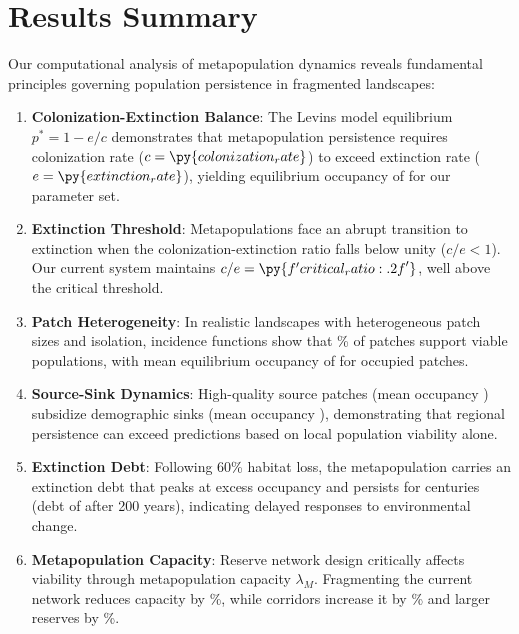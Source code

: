 \documentclass[11pt,a4paper]{article}
\begin{document}
\section{Results Summary}

Our computational analysis of metapopulation dynamics reveals fundamental principles governing population persistence in fragmented landscapes:

\begin{enumerate}
\item \textbf{Colonization-Extinction Balance}: The Levins model equilibrium $p^* = 1 - e/c$ demonstrates that metapopulation persistence requires colonization rate ($c = \py{colonization_rate}$) to exceed extinction rate ($e = \py{extinction_rate}$), yielding equilibrium occupancy of  for our parameter set.

\item \textbf{Extinction Threshold}: Metapopulations face an abrupt transition to extinction when the colonization-extinction ratio falls below unity ($c/e < 1$). Our current system maintains $c/e = \py{f'{critical_ratio:.2f}'}$, well above the critical threshold.

\item \textbf{Patch Heterogeneity}: In realistic landscapes with heterogeneous patch sizes and isolation, incidence functions show that \% of patches support viable populations, with mean equilibrium occupancy of  for occupied patches.

\item \textbf{Source-Sink Dynamics}: High-quality source patches (mean occupancy ) subsidize demographic sinks (mean occupancy ), demonstrating that regional persistence can exceed predictions based on local population viability alone.

\item \textbf{Extinction Debt}: Following 60\% habitat loss, the metapopulation carries an extinction debt that peaks at  excess occupancy and persists for centuries (debt of  after 200 years), indicating delayed responses to environmental change.

\item \textbf{Metapopulation Capacity}: Reserve network design critically affects viability through metapopulation capacity $\lambda_M$. Fragmenting the current network reduces capacity by \%, while corridors increase it by \% and larger reserves by \%.
\end{enumerate}
\end{document}

